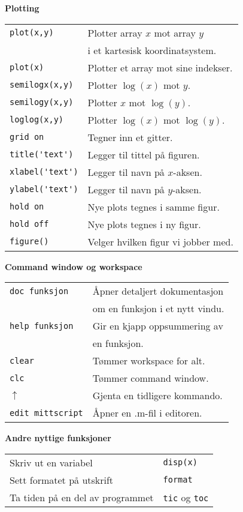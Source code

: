 \documentclass[a4paper, 12pt, notitlepage, english]{article}
\begin{document}
\begin{multicols}{2}
{\large \bf Plotting}
$ $ \\
\begin{tabular}{l l}
\verb+plot(x,y)+ & Plotter array $x$ mot array $y$ \\[-0.5cm]
& i et kartesisk koordinatsystem. \\
\verb+plot(x)+ & Plotter et array mot sine indekser. \\
\verb+semilogx(x,y)+ & Plotter $\log(x)$ mot $y$. \\
\verb+semilogy(x,y)+ & Plotter $x$ mot $\log(y)$. \\
\verb+loglog(x,y)+ & Plotter $\log(x)$ mot $\log(y)$. \\
\verb+grid on+ & Tegner inn et gitter. \\
\verb+title('text')+ & Legger til tittel på figuren. \\
\verb+xlabel('text')+ & Legger til navn på $x$-aksen. \\
\verb+ylabel('text')+ & Legger til navn på $y$-aksen. \\
\verb+hold on+ & Nye plots tegnes i samme figur. \\
\verb+hold off+ & Nye plots tegnes i ny figur. \\
\verb+figure()+ & Velger hvilken figur vi jobber med.
\end{tabular}

\vspace{1 cm}

{\large \bf Command window og workspace}
$ $ \\\begin{tabular}{l l}
\verb+doc funksjon+ & Åpner detaljert dokumentasjon \\[-0.5cm] & om en funksjon i et nytt vindu. \\
\verb+help funksjon+ & Gir en kjapp oppsummering av \\[-0.5cm] &  en funksjon. \\
\verb+clear+ & Tømmer workspace for alt. \\
\verb+clc+ & Tømmer command window. \\
$\uparrow$ & Gjenta en tidligere kommando. \\
\verb+edit mittscript+ & Åpner en .m-fil i editoren.
\end{tabular}

\vspace{1cm}

{\large \bf Andre nyttige funksjoner}
$ $ \\ 
\begin{tabular}{l l}
Skriv ut en variabel & \verb+disp(x)+ \\
Sett formatet på utskrift & \verb+format+ \\
Ta tiden på en del av programmet & \verb+tic+ og \verb+toc+
\end{tabular}


\end{multicols}
\end{document}
